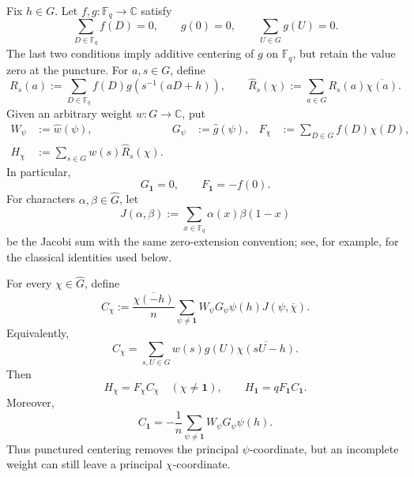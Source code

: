 Fix \(h\in G\).  Let \(f,g:\mathbb F_q\to\mathbb C\) satisfy
\begin{equation}
 \sum_{D\in\mathbb F_q}f(D)=0,
 \qquad
 g(0)=0,
 \qquad
 \sum_{U\in G}g(U)=0.
 \label{eq:tpc37-punctured-centering}
\end{equation}
The last two conditions imply additive centering of \(g\) on
\(\mathbb F_q\), but retain the value zero at the puncture.  For
\(a,s\in G\), define
\begin{equation}
 R_s(a):=\sum_{D\in\mathbb F_q}
 f(D)g\!\left(s^{-1}(aD+h)\right),
 \qquad
 \widehat R_s(\chi):=
 \sum_{a\in G}R_s(a)\overline{\chi(a)}.
 \label{eq:tpc37-R-and-Rhat}
\end{equation}
Given an arbitrary weight \(w:G\to\mathbb C\), put
\begin{align}
 W_\psi&:=\widehat w(\psi),
 &G_\psi&:=\widehat g(\psi),
 &F_\chi&:=\sum_{D\in G}f(D)\chi(D),
 \label{eq:tpc37-W-G-F}\\
 H_\chi&:=\sum_{s\in G}w(s)\widehat R_s(\chi).
 \label{eq:tpc37-Hchi}
\end{align}
In particular,
\begin{equation}
 G_{\mathbf1}=0,
 \qquad F_{\mathbf1}=-f(0).
 \label{eq:tpc37-principal-FG}
\end{equation}
For characters \(\alpha,\beta\in\widehat G\), let
\begin{equation}
 J(\alpha,\beta)
 :=\sum_{x\in\mathbb F_q}\alpha(x)\beta(1-x)
 \label{eq:tpc37-Jacobi-definition}
\end{equation}
be the Jacobi sum with the same zero-extension convention; see, for
example, \citep[Chapter~8]{IrelandRosen1990} for the classical identities
used below.

\begin{theorem}
\label{thm:tpc37-two-character-formula}
For every \(\chi\in\widehat G\), define
\begin{equation}
 C_\chi
 :=\frac{\overline{\chi(-h)}}n
 \sum_{\psi\ne\mathbf1}
 W_\psi G_\psi\psi(h)J(\psi,\overline\chi).
 \label{eq:tpc37-Cchi-Jacobi}
\end{equation}
Equivalently,
\begin{equation}
 C_\chi
 =\sum_{s,U\in G}w(s)g(U)
 \overline{\chi(sU-h)}.
 \label{eq:tpc37-Cchi-direct}
\end{equation}
Then
\begin{equation}
 \boxed{
 H_\chi=F_\chi C_\chi
 \quad(\chi\ne\mathbf1),
 \qquad
 H_{\mathbf1}=qF_{\mathbf1}C_{\mathbf1}.}
 \label{eq:tpc37-Hchi-split}
\end{equation}
Moreover,
\begin{equation}
 \boxed{
 C_{\mathbf1}
 =-\frac1n\sum_{\psi\ne\mathbf1}
 W_\psi G_\psi\psi(h).}
 \label{eq:tpc37-principal-C}
\end{equation}
Thus punctured centering removes the principal \(\psi\)-coordinate, but
an incomplete weight can still leave a principal \(\chi\)-coordinate.
\end{theorem}

